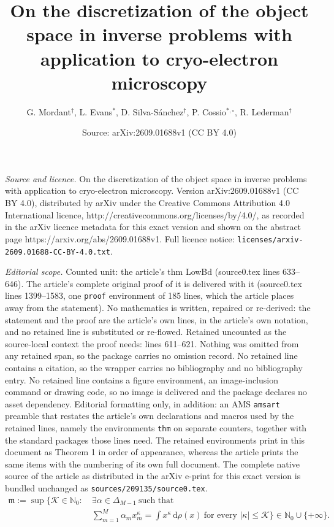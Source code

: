 \documentclass[10pt,a4paper]{amsart}
\title{On the discretization of the object space in inverse problems with application to cryo-electron microscopy}
\author{G. Mordant$^\dagger$, L. Evans$^{*}$, D. Silva-S{\'a}nchez$^{\dagger}$, P. Cossio$^{*,\circ}$, R. Lederman$^{\dagger}$}
\date{Source: arXiv:2609.01688v1 (CC BY 4.0)}
\providecommand{\diff}{\mathrm{d}}
\begin{document}
\maketitle

\noindent\emph{Source and licence.} On the discretization of the object space in inverse problems with application to cryo-electron microscopy. Version arXiv:2609.01688v1 (CC BY 4.0), distributed by arXiv under the Creative Commons Attribution 4.0 International licence, http://creativecommons.org/licenses/by/4.0/, as recorded in the arXiv licence metadata for this exact version and shown on the abstract page https://arxiv.org/abs/2609.01688v1. Full licence notice: \texttt{licenses/arxiv-2609.01688-CC-BY-4.0.txt}.\par\smallskip

\noindent\textit{Editorial scope.} Counted unit: the article's thm LowBd (source0.tex lines 633--646). The article's complete original proof of it is delivered with it (source0.tex lines 1399--1583, one \texttt{proof} environment of 185 lines, which the article places away from the statement). No mathematics is written, repaired or re-derived: the statement and the proof are the article's own lines, in the article's own notation, and no retained line is substituted or re-flowed.  Retained uncounted as the source-local context the proof needs: lines 611--621.  Nothing was omitted from any retained span, so the package carries no omission record.  No retained line contains a citation, so the wrapper carries no bibliography and no bibliography entry.  No retained line contains a figure environment, an image-inclusion command or drawing code, so no image is delivered and the package declares no asset dependency.  Editorial formatting only, in addition: an AMS \texttt{amsart} preamble that restates the article's own declarations and macros used by the retained lines, namely the environments \texttt{thm} on separate counters, together with the standard packages those lines need.  The retained environments print in this document as Theorem 1 in order of appearance, whereas the article prints the same items with the numbering of its own full document.  The complete native source of the article as distributed in the arXiv e-print for this exact version is bundled unchanged as \texttt{sources/209135/source0.tex}.
\begin{equation}
\label{eq: NumMom}
\begin{aligned}
\mathfrak m:=\sup\bigg\{\mathcal K\in\mathbb N_0:\ &
\exists\alpha\in\Delta_{M-1}\ \text{such that}\\[-2pt]
&\sum_{m=1}^M\alpha_m x_m^\kappa
=\int x^\kappa\,\diff\rho(x)
\ \text{for every }|\kappa|\leq\mathcal K
\bigg\}\in\mathbb N_0\cup\{+\infty\}.
\end{aligned}
\end{equation}
\end{document}
